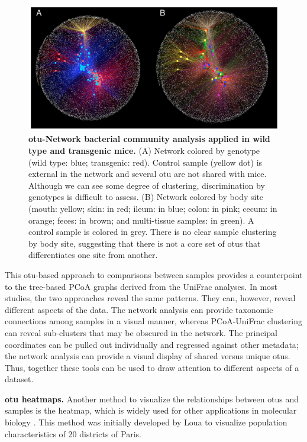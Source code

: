 \begin{figure}[htbp]
\includegraphics[width=\columnwidth]{chapter_book_figures/Figure_13.jpg}
\caption[\gls{otu}-Network bacterial community analysis applied in wild type and transgenic mice]{\textbf{\gls{otu}-Network bacterial community analysis applied in wild type and transgenic mice.}
(A) Network colored by genotype (wild type: blue; transgenic: red). Control sample (yellow dot) is
external in the network and several \gls{otu} are not shared with mice. Although we can see some degree of
clustering, discrimination by genotypes is difficult to assess. (B) Network colored by body site
(mouth: yellow; skin: in red; ileum: in blue; colon: in pink; cecum: in orange; feces: in brown;
and multi-tissue samples: in green). A control sample is colored in grey. There is no clear sample
clustering by body site, suggesting that there is not a core set of \gls{otu}s that differentiates one site from another.}
\label{bfigure13}
\end{figure}

This \gls{otu}-based approach to comparisons between samples provides a counterpoint to the
tree-based PCoA graphs derived from the UniFrac analyses. In most studies, the two
approaches reveal the same patterns. They can, however, reveal different aspects of the
data. The network analysis can provide taxonomic connections among samples in a visual manner,
whereas PCoA-UniFrac clustering can reveal sub-clusters that may be obscured in the network.
The principal coordinates can be pulled out individually and regressed against other metadata;
the network analysis can provide a visual display of shared versus unique \gls{otu}s. Thus, together
these tools can be used to draw attention to different aspects of a dataset.

\textbf{\gls{otu} heatmaps.} Another method to visualize the relationships between \gls{otu}s
and samples is the heatmap, which is widely used for other applications in molecular
biology \cite{Wilkinson2009}. This method was initially developed by Loua \cite{Loua1873}
to visualize population characteristics of 20 districts of Paris.

